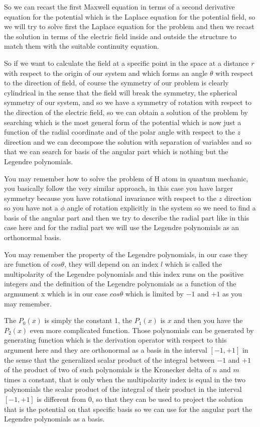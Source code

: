 \documentclass[../main/main.tex]{subfiles}
\begin{document}
So we can recast the first Maxwell equation in terms of a second derivative equation for the potential which is the Laplace equation for the potential field, so we will try to solve first the Laplace equation for the problem and then we recast the solution in terms of the electric field inside and outside the structure to match them with the suitable continuity equation. 

So if we want to calculate the field at a specific point in the space at a distance $r$ with respect to the origin of our system and which forms an angle $\theta$ with respect to the direction of field, of course the symmetry of our problem is clearly cylindrical in the sense that the field will break the symmetry, the spherical symmetry of our system, and so we have a symmetry of rotation with respect to the direction of the electric field, so we can obtain a solution of the problem by searching which is the most general form of the potential which is now just a function of the radial coordinate and of the polar angle with respect to the $z$ direction and we can decompose the solution with separation of variables and so that we can search for basis of the angular part which is nothing but the Legendre polynomials.

You may remember how to solve the problem of H atom in quantum mechanic, you basically follow the very similar approach, in this case you have larger symmetry because you have rotational invariance with respect to the $z$ direction so you have not a $\phi$ angle of rotation explicitly in the system so we need to find a basis of the angular part and then we try to describe the radial part like in this case here and for the radial part we will use the Legendre polynomials as an orthonormal basis.

You may remember the property of the Legendre polynomials, in our case they are function of $cos\theta$, they will depend on an index $l$ which is called the multipolarity of the Legendre polynomials and this index runs on the positive integers and the definition of the Legendre polynomials as a function of the argmument x which is in our case $cos\theta$ which is limited by $-1$ and $+1$ as you may remember.

The $P_0(x)$ is simply the constant 1, the $P_1(x)$ is $x$ and then you have the $P_2(x)$ even more complicated function. Those polynomials can be generated by generating function which is the derivation operator with respect to this argument here and they are orthonormal as a basis in the interval $[-1,+1]$ in the sense that the generalized scalar product of the integral between $-1$ and $+1$ of the product of two of such polynomials is the Kronecker delta of $n$ and $m$ times a constant, that is only when the multipolarity index is equal in the two polynomials the scalar product of the integral of their product in the interval $[-1,+1]$ is different from $0$, so that they can be used to project the solution that is the potential on that specific basis so we can use for the angular part the Legendre polynomials as a basis. 
\end{document}
